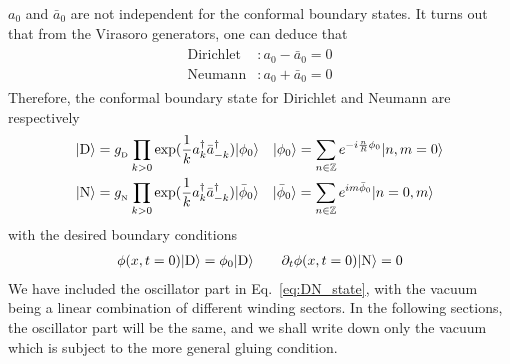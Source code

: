 
$a_0$ and $\bar{a}_0$ are not independent for the conformal boundary states. It turns out that from the Virasoro generators, one can deduce that
\begin{eqnarray}\begin{aligned}
\label{eq:DN_a}
\text{Dirichlet}&:a_0-\bar{a}_0=0\\
\text{Neumann}&:a_0+\bar{a}_0=0
\end{aligned}\end{eqnarray}
Therefore, the conformal boundary state for Dirichlet and Neumann are respectively
\begin{eqnarray}\begin{aligned}
\label{eq:DN_state}
|{\rm D} \rangle  &= g_{\,\!_\text{D}}  \prod_{k > 0 } \exp(\frac{1}{k} a_k^{\dagger} \bar{a}_{-k}^{\dagger} )| \phi_0 \rangle \quad | \phi_0 \rangle = \sum_{n \in \mathbb{Z}} e^{-i \frac{n}{R}\phi_0 } | n, m = 0 \rangle \\
| {\rm N} \rangle &= g_{\,\!_\text{N}} \prod_{k > 0 } \exp(\frac{1}{k} a_k^{\dagger} \bar{a}_{-k}^{\dagger} )| \bar{\phi}_0 \rangle \quad | \bar{\phi}_0 \rangle = \sum_{n \in \mathbb{Z}} e^{i m \bar{\phi}_0 } | n = 0, m \rangle 
\end{aligned}\end{eqnarray}
with the desired boundary conditions
\begin{eqnarray}\begin{aligned}
\phi(x,t=0)|{\rm D} \rangle=\phi_0|{\rm D} \rangle\qquad \partial_t \phi( x, t = 0 ) | {\rm N } \rangle = 0
\end{aligned}\end{eqnarray}
We have included the oscillator part in Eq.~\eqref{eq:DN_state}, with the vacuum being a linear combination of different winding sectors. In the following sections, the oscillator part will be the same, and we shall write down only the vacuum which is subject to the more general gluing condition.

